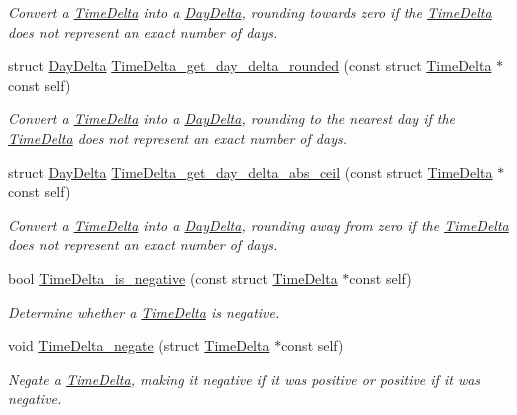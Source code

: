 \begin{DoxyCompactItemize}
\begin{DoxyCompactList}\small\item\em \-Convert a \hyperlink{structTimeDelta}{\-Time\-Delta} into a \hyperlink{structDayDelta}{\-Day\-Delta}, rounding towards zero if the \hyperlink{structTimeDelta}{\-Time\-Delta} does not represent an exact number of days. \end{DoxyCompactList}\item 
struct \hyperlink{structDayDelta}{\-Day\-Delta} \hyperlink{time-delta_8h_aae6864e3044344d9f27dab1bf22cb33c}{\-Time\-Delta\-\_\-get\-\_\-day\-\_\-delta\-\_\-rounded} (const struct \hyperlink{structTimeDelta}{\-Time\-Delta} $\ast$const self)
\begin{DoxyCompactList}\small\item\em \-Convert a \hyperlink{structTimeDelta}{\-Time\-Delta} into a \hyperlink{structDayDelta}{\-Day\-Delta}, rounding to the nearest day if the \hyperlink{structTimeDelta}{\-Time\-Delta} does not represent an exact number of days. \end{DoxyCompactList}\item 
struct \hyperlink{structDayDelta}{\-Day\-Delta} \hyperlink{time-delta_8h_ad86ae02779b9fde0613cba364522ec99}{\-Time\-Delta\-\_\-get\-\_\-day\-\_\-delta\-\_\-abs\-\_\-ceil} (const struct \hyperlink{structTimeDelta}{\-Time\-Delta} $\ast$const self)
\begin{DoxyCompactList}\small\item\em \-Convert a \hyperlink{structTimeDelta}{\-Time\-Delta} into a \hyperlink{structDayDelta}{\-Day\-Delta}, rounding away from zero if the \hyperlink{structTimeDelta}{\-Time\-Delta} does not represent an exact number of days. \end{DoxyCompactList}\item 
bool \hyperlink{time-delta_8h_a8b0be83d6cd6ab623f05ea0eb5d560c7}{\-Time\-Delta\-\_\-is\-\_\-negative} (const struct \hyperlink{structTimeDelta}{\-Time\-Delta} $\ast$const self)
\begin{DoxyCompactList}\small\item\em \-Determine whether a \hyperlink{structTimeDelta}{\-Time\-Delta} is negative. \end{DoxyCompactList}\item 
void \hyperlink{time-delta_8h_a906aa66074e2d9ef675ea2d2a1d25084}{\-Time\-Delta\-\_\-negate} (struct \hyperlink{structTimeDelta}{\-Time\-Delta} $\ast$const self)
\begin{DoxyCompactList}\small\item\em \-Negate a \hyperlink{structTimeDelta}{\-Time\-Delta}, making it negative if it was positive or positive if it was negative. \end{DoxyCompactList}\item 

\end{DoxyCompactItemize}
